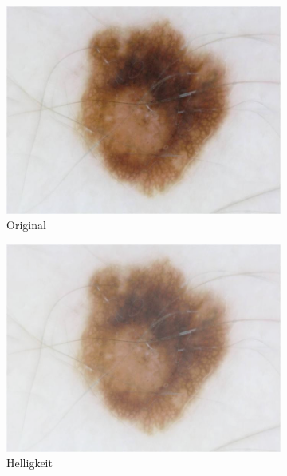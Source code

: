 \begin{figure}[t!]
	\centering
	\begin{subfigure}{0.24\linewidth}
		\includegraphics[width=\textwidth]{./pics/augmentations/original.jpg}
		\caption{Original}
		\label{subfig:aug_original}
	\end{subfigure}
	\begin{subfigure}{0.24\linewidth}
		\includegraphics[width=\textwidth]{./pics/augmentations/brightness.png}
		\caption{Helligkeit}
		\label{subfig:aug_bright}
	\end{subfigure}
	\begin{subfigure}{0.24\linewidth}

\end{subfigure}
\end{figure}
